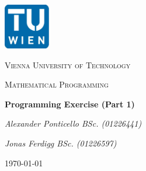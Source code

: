 
\begin{titlepage}
	\centering
	\includegraphics[width=0.15\textwidth]{./img/logo_tuwien.png}\par\vspace{1cm}
	{\scshape\LARGE Vienna University of Technology \par}
	\vspace{1cm}
	{\scshape\Large Mathematical Programming \par}
	\vspace{1.5cm}
	{\huge\bfseries Programming Exercise (Part 1)  \par}
	\vspace{2cm}
	{\Large\itshape Alexander Ponticello BSc. (01226441) \par}
	{\Large\itshape Jonas Ferdigg BSc. (01226597) \par}
	\vfill
	\vspace*{1ex}
	{\large \today\par}
\end{titlepage}

